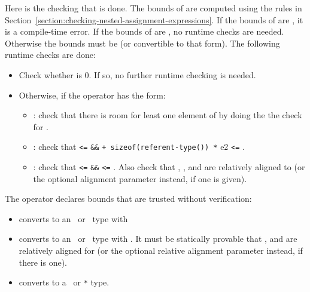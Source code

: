 Here is the checking that is done. The bounds of  are computed
using the rules in Section~\ref{section:checking-nested-assignment-expressions}.
If the bounds of  are \boundsnone, it is a compile-time error. 
If the bounds of  are \boundsany, no runtime checks are needed.
Otherwise the bounds must be  (or convertible to that form).
The following runtime checks are done:
\begin{itemize}
\item Check whether  is 0.  If so, no further runtime checking
is needed.
\item Otherwise, if the operator has the form:
\begin{itemize}
\item
  :
  check that there is room for least one element of  by doing the
  the check for .
\item
  :
   check that 
  \texttt{<=}  \texttt{\&\&}  \texttt{+
  sizeof(referent-type(}\texttt{)) *} e2 \texttt{<=}
  .
\item
  : 
  check that  \texttt{<=}  \texttt{\&\&}
   \texttt{<=} . Also check that , , and  
  are relatively aligned to  (or the optional alignment parameter instead, if one
  is given). 

\end{itemize}
\end{itemize}

The operator  declares bounds that are trusted
without verification:
\begin{itemize}
\item
  converts  to an \arrayptr\ or
  \spanptr\ type with 
\item
  converts  to an
  \arrayptr\ or \spanptr\ type with .
  It must be statically provable that ,  and 
  are relatively aligned for  (or the optional
  relative alignment parameter instead, if there is one).
\item
  converts  to a \ptr\ or \texttt{*} type.
\end{itemize}

